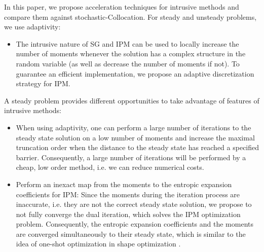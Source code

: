 In this paper, we propose acceleration techniques for intrusive methods and compare them against stochastic-Collocation. For steady and unsteady problems, we use adaptivity:
\begin{itemize}
\item The intrusive nature of SG and IPM can be used to locally increase the number of moments whenever the solution has a complex structure in the random variable (as well as decrease the number of moments if not). To guarantee an efficient implementation, we propose an adaptive discretization strategy for IPM.
\end{itemize}
A steady problem provides different opportunities to take advantage of features of intrusive methods: 
\begin{itemize}
\item When using adaptivity, one can perform a large number of iterations to the steady state solution on a low number of moments and increase the maximal truncation order when the distance to the steady state has reached a specified barrier. Consequently, a large number of iterations will be performed by a cheap, low order method, i.e. we can reduce numerical costs. 
\item Perform an inexact map from the moments to the entropic expansion coefficients for IPM: Since the moments during the iteration process are inaccurate, i.e. they are not the correct steady state solution, we propose to not fully converge the dual iteration, which solves the IPM optimization problem. Consequently, the entropic expansion coefficients and the moments are converged simultaneously to their steady state, which is similar to the idea of one-shot optimization in shape optimization \cite{hazra2005aerodynamic}.
\end{itemize}

